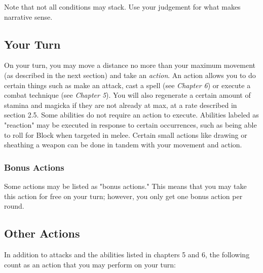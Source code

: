Note that not all conditions may stack. Use your judgement for what makes narrative sense.

\subsection{Your Turn}
On your turn, you may move a distance no more than your maximum movement (as described in the next section) and take an \textit{action}. An action allows you to do certain things such as make an attack, cast a spell (see \textit{Chapter 6}) or execute a combat technique (see \textit{Chapter 5}). You will also regenerate a certain amount of stamina and magicka if they are not already at max, at a rate described in section 2.5. Some abilities do not require an action to execute. Abilities labeled as "reaction" may be executed in response to certain occurrences, such as being able to roll for Block when targeted in melee. Certain small actions like drawing or sheathing a weapon can be done in tandem with your movement and action.

\subsubsection{Bonus Actions}
Some actions may be listed as "bonus actions." This means that you may take this action for free on your turn; however, you only get one bonus action per round.

\subsection{Other Actions}
In addition to attacks and the abilities listed in chapters 5 and 6, the following count as an action that you may perform on your turn:

